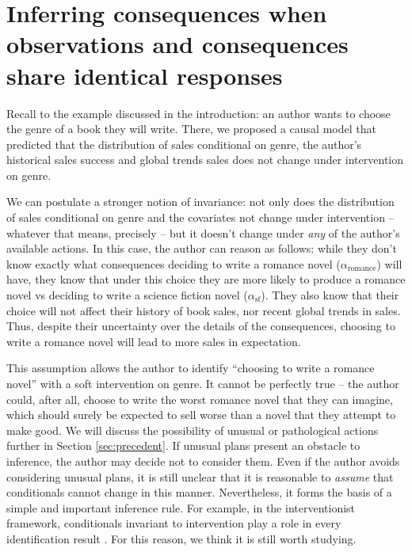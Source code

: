
\section[Identical responses]{Inferring consequences when observations and consequences share identical responses}\label{sec:evaluating_decisions}

Recall to the example discussed in the introduction: an author wants to choose the genre of a book they will write. There, we proposed a causal model that predicted that the distribution of sales conditional on genre, the author's historical sales success and global trends sales does not change under intervention on genre.

We can postulate a stronger notion of invariance: not only does the distribution of sales conditional on genre and the covariates not change under intervention -- whatever that means, precisely -- but it doesn't change under \emph{any} of the author's available actions. In this case, the author can reason as follows: while they don't know exactly what consequences deciding to write a romance novel ($\alpha_{\mathrm{romance}}$) will have, they know that under this choice they are more likely to produce a romance novel vs deciding to write a science fiction novel ($\alpha_{\mathrm{sf}}$). They also know that their choice will not affect their history of book sales, nor recent global trends in sales. Thus, despite their uncertainty over the details of the consequences, choosing to write a romance novel will lead to more sales in expectation.

This assumption allows the author to identify ``choosing to write a romance novel'' with a soft intervention on genre. It cannot be perfectly true -- the author could, after all, choose to write the worst romance novel that they can imagine, which should surely be expected to sell worse than a novel that they attempt to make good. We will discuss the possibility of unusual or pathological actions further in Section \ref{sec:precedent}. If unusual plans present an obstacle to inference, the author may decide not to consider them. Even if the author avoids considering unusual plans, it is still unclear that it is reasonable to \emph{assume} that conditionals cannot change in this manner. Nevertheless, it forms the basis of a simple and important inference rule. For example, in the interventionist framework, conditionals invariant to intervention play a role in every identification result \citep{richardson_nested_2017}. For this reason, we think it is still worth studying.

